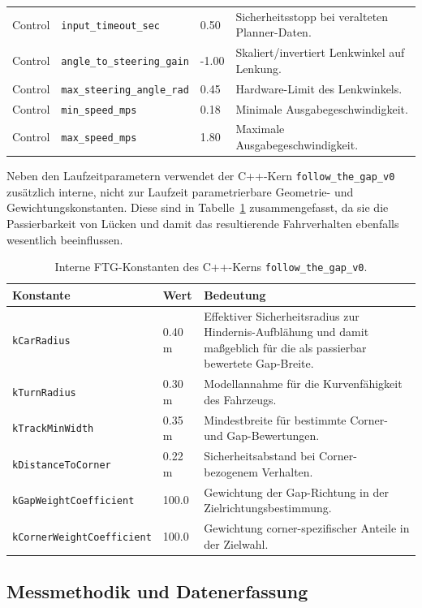 \begin{longtable}{p{2.6cm} p{3.0cm} p{1.8cm} p{6.2cm}}
Control & \texttt{input\_timeout\_sec} & 0.50 & Sicherheitsstopp bei veralteten Planner-Daten. \\
Control & \texttt{angle\_to\_steering\_gain} & -1.00 & Skaliert/invertiert Lenkwinkel auf Lenkung. \\
Control & \texttt{max\_steering\_angle\_rad} & 0.45 & Hardware-Limit des Lenkwinkels. \\
Control & \texttt{min\_speed\_mps} & 0.18 & Minimale Ausgabegeschwindigkeit. \\
Control & \texttt{max\_speed\_mps} & 1.80 & Maximale Ausgabegeschwindigkeit. \\
\bottomrule
\end{longtable}

Neben den Laufzeitparametern verwendet der C++-Kern \texttt{follow\_the\_gap\_v0} zusätzlich interne, nicht zur Laufzeit parametrierbare Geometrie- und Gewichtungskonstanten. Diese sind in Tabelle~\ref{tab:ftg_internal_constants} zusammengefasst, da sie die Passierbarkeit von Lücken und damit das resultierende Fahrverhalten ebenfalls wesentlich beeinflussen.

\begin{table}[H]
\centering
\caption{Interne FTG-Konstanten des C++-Kerns \texttt{follow\_the\_gap\_v0}.}
\label{tab:ftg_internal_constants}
\begin{tabularx}{\textwidth}{l l X}
\toprule
\textbf{Konstante} & \textbf{Wert} & \textbf{Bedeutung} \\
\midrule
\texttt{kCarRadius} & 0.40 m & Effektiver Sicherheitsradius zur Hindernis-Aufblähung und damit maßgeblich für die als passierbar bewertete Gap-Breite. \\
\texttt{kTurnRadius} & 0.30 m & Modellannahme für die Kurvenfähigkeit des Fahrzeugs. \\
\texttt{kTrackMinWidth} & 0.35 m & Mindestbreite für bestimmte Corner- und Gap-Bewertungen. \\
\texttt{kDistanceToCorner} & 0.22 m & Sicherheitsabstand bei Corner-bezogenem Verhalten. \\
\texttt{kGapWeightCoefficient} & 100.0 & Gewichtung der Gap-Richtung in der Zielrichtungsbestimmung. \\
\texttt{kCornerWeightCoefficient} & 100.0 & Gewichtung corner-spezifischer Anteile in der Zielwahl. \\
\bottomrule
\end{tabularx}
\end{table}


\subsection{Messmethodik und Datenerfassung}
\label{sec:messmethodik}

